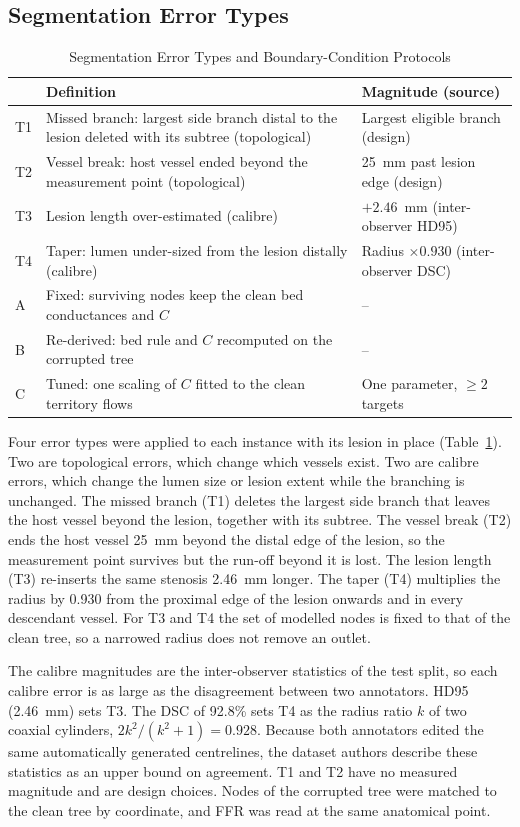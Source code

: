 \documentclass[journal]{IEEEtran}
\begin{document}
\subsection{Segmentation Error Types}
\begin{table}[!t]
\caption{Segmentation Error Types and Boundary-Condition Protocols}
\label{tab:design}
\centering\footnotesize
\begin{tabular}{@{}p{0.6cm}p{4.9cm}p{2.5cm}@{}}
\toprule
 & Definition & Magnitude (source)\\
\midrule
T1 & Missed branch: largest side branch distal to the lesion deleted with its subtree (topological) & Largest eligible branch (design)\\
T2 & Vessel break: host vessel ended beyond the measurement point (topological) & 25~mm past lesion edge (design)\\
T3 & Lesion length over-estimated (calibre) & $+2.46$~mm (inter-observer HD95)\\
T4 & Taper: lumen under-sized from the lesion distally (calibre) & Radius $\times 0.930$ (inter-observer DSC)\\
\midrule
A & Fixed: surviving nodes keep the clean bed conductances and $C$ & --\\
B & Re-derived: bed rule and $C$ recomputed on the corrupted tree & --\\
C & Tuned: one scaling of $C$ fitted to the clean territory flows & One parameter, $\geq 2$ targets\\
\bottomrule
\end{tabular}
\end{table}
Four error types were applied to each instance with its lesion in place (Table~\ref{tab:design}). Two are
topological errors, which change which vessels exist. Two are calibre errors, which change the lumen size or lesion
extent while the branching is unchanged. The missed branch (T1) deletes the largest side branch that leaves the host
vessel beyond the lesion, together with its subtree. The vessel break (T2) ends the host vessel 25~mm beyond the
distal edge of the lesion, so the measurement point survives but the run-off beyond it is lost. The lesion length
(T3) re-inserts the same stenosis 2.46~mm longer. The taper (T4) multiplies the radius by 0.930 from the proximal
edge of the lesion onwards and in every descendant vessel. For T3 and T4 the set of modelled nodes is fixed to that
of the clean tree, so a narrowed radius does not remove an outlet.

The calibre magnitudes are the inter-observer statistics of the test split, so each calibre error is as large as
the disagreement between two annotators. HD95 (2.46~mm) sets T3. The DSC of 92.8\% sets T4 as the radius
ratio $k$ of two coaxial cylinders, $2k^2/(k^2+1) = 0.928$. Because both annotators edited the same automatically
generated centrelines, the dataset authors describe these statistics as an upper bound on agreement. T1 and T2 have
no measured magnitude and are design choices. Nodes of the corrupted tree were matched to the clean tree by
coordinate, and FFR was read at the same anatomical point.
\end{document}
